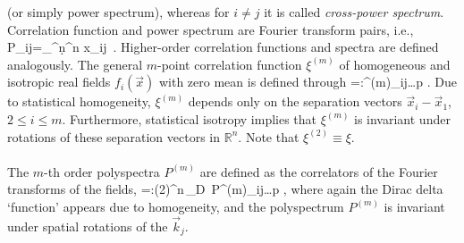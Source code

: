 {(or simply power spectrum), 
whereas for $i\ne j$ it is called {\it cross-power spectrum}.
Correlation function and power spectrum are
Fourier transform pairs, i.e.,
%
\be
P_{ij}=\int_{^n}\d^n x\;\xi_{ij}\, \exp{}\;.
\label{eq:CFS.3}
\ee
Higher-order correlation functions and spectra are defined
analogously. The general $m$-point correlation function $\xi^{(m)}$ of 
homogeneous and isotropic real fields $f_i(\vec x)$ with zero mean is
defined through 
%
\be
{}=:\xi^{(m)}_{ij\dots p} \;.
\label{eq:CFPS.4}
\ee
%
Due to statistical homogeneity, $\xi^{(m)}$ depends only on the
separation vectors $\vec x_i-\vec x_1$, $2\le i\le m$. Furthermore,
statistical isotropy implies that $\xi^{(m)}$ is invariant under
rotations of these separation vectors in $\mathbb{R}^n$.  Note that
$\xi^{(2)}\equiv \xi$. 
\\
\\
The $m$-th order polyspectra $P^{(m)}$ are defined as the correlators of the
Fourier transforms of the fields,
%
\be
{}=:(2\pi)^n\,\delta_{\rm D}\,
P^{(m)}_{ij\dots p} \;,
\label{eq:CFPS.5}
\ee
%
where again the Dirac delta `function' appears due to homogeneity, and
the polyspectrum $P^{(m)}$ is invariant under spatial
rotations of the $\vec k_j$.
}

